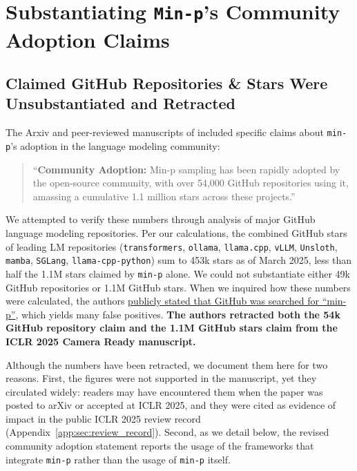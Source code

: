 \section{Substantiating \texttt{Min-p}'s Community Adoption Claims}
\label{sec:community_adoption}

\subsection{Claimed GitHub Repositories \& Stars Were Unsubstantiated and Retracted}

The Arxiv and peer-reviewed manuscripts of \citet{nguyen2024minp} included specific claims about \texttt{min-p}'s adoption in the language modeling community:
%
\begin{quote}
    ``\textbf{Community Adoption:} Min-p sampling has been rapidly adopted by the open-source community, with over 54,000 GitHub repositories using it, amassing a cumulative 1.1 million stars across these projects.''
\end{quote}
%
We attempted to verify these numbers through analysis of major GitHub language modeling repositories.
Per our calculations, the combined GitHub stars of leading LM repositories (\texttt{transformers}, \texttt{ollama}, \texttt{llama.cpp}, \texttt{vLLM}, \texttt{Unsloth}, \texttt{mamba}, \texttt{SGLang}, \texttt{llama-cpp-python}) sum to 453k stars as of March 2025, less than half the 1.1M stars claimed by \texttt{min-p} alone.
We could not substantiate either 49k GitHub repositories or 1.1M GitHub stars. 
When we inquired how these numbers were calculated, the authors \href{https://github.com/menhguin/minp_paper/issues/6#issuecomment-2686274162}{publicly stated that GitHub was searched for ``min-p''}, which yields many false positives. \textbf{The authors retracted both the 54k GitHub repository claim and the 1.1M GitHub stars claim from the ICLR 2025 Camera Ready manuscript.}

Although the numbers have been retracted, we document them here for two reasons.
First, the figures were not supported in the manuscript, yet they circulated widely: readers may have encountered them when the paper was posted to arXiv or accepted at ICLR 2025, and they were cited as evidence of impact in the public ICLR 2025 review record (Appendix~\ref{app:sec:review_record}).
Second, as we detail below, the revised community adoption statement reports the usage of the frameworks that integrate \texttt{min-p} rather than the usage of \texttt{min-p} itself.

